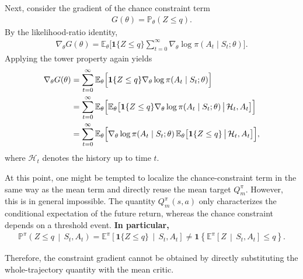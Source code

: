 Next, consider the gradient of the chance constraint term
\begin{align}
    G(\theta)
    =
    \mathbb{P}_{\theta}(Z\le q).
\end{align}
By the likelihood-ratio identity,
\begin{align}
    \nabla_{\theta}G(\theta)
    =
    \mathbb{E}_{\theta}\Biggl[
        \mathbf{1}\{Z\le q\}
        \sum_{t=0}^{\infty}
        \nabla_{\theta}\log\pi(A_t\mid S_t;\theta)
    \Biggr].
\end{align}
Applying the tower property again yields
\begin{align}
    \nabla_{\theta}G(\theta)
    &=
    \sum_{t=0}^{\infty}
    \mathbb{E}_{\theta}\Bigl[
        \mathbf{1}\{Z\le q\}
        \nabla_{\theta}\log\pi(A_t\mid S_t;\theta)
    \Bigr] \label{eq:risk_local_1}\\
    &=
    \sum_{t=0}^{\infty}
    \mathbb{E}_{\theta}\Bigl[
        \mathbb{E}_{\theta}\bigl[
            \mathbf{1}\{Z\le q\}
            \nabla_{\theta}\log\pi(A_t\mid S_t;\theta)
            \,\big|\,
            \mathcal{H}_t,A_t
        \bigr]
    \Bigr] \label{eq:risk_local_2}\\
    &=
    \sum_{t=0}^{\infty}
    \mathbb{E}_{\theta}\Bigl[
        \nabla_{\theta}\log\pi(A_t\mid S_t;\theta)
        \,
        \mathbb{E}_{\theta}\bigl[
            \mathbf{1}\{Z\le q\}
            \,\big|\,
            \mathcal{H}_t,A_t
        \bigr]
    \Bigr], \label{eq:risk_local_3}
\end{align}
where $\mathcal{H}_t$ denotes the history up to time $t$.

At this point, one might be tempted to localize the chance-constraint term in the same way as the mean term and directly reuse the mean target $Q_m^\pi$. However, this is in general impossible. The quantity $Q_m^\pi(s,a)$ only characterizes the conditional expectation of the future return, whereas the chance constraint depends on a threshold event. \textbf{\textcolor{ECNURed}{
In particular,
\begin{align}
    \mathbb{P}^{\pi}\!\left(
        Z\le q
        \,\middle|\,
        S_t,A_t
    \right)
    =
    \mathbb{E}^{\pi}\!\left[
        \mathbf{1}\{Z\le q\}
        \,\middle|\,
        S_t,A_t
    \right]
    \neq\mathbf{1}\!\left\{
        \mathbb{E}^{\pi}\!\left[
            Z
            \,\middle|\,
            S_t,A_t
        \right]
        \le q
    \right\}.
\end{align}
}}

Therefore, the constraint gradient cannot be obtained by directly substituting the whole-trajectory quantity with the mean critic.

